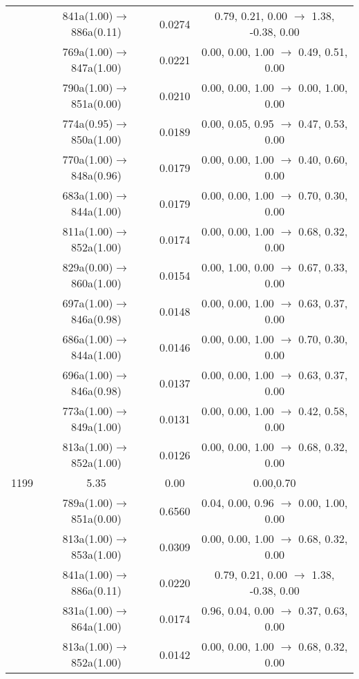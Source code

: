 \documentclass[10pt,a4paper]{article}
\begin{document}
\begin{longtable}{c|c|c|c}
 	& 841a(1.00)$\rightarrow$886a(0.11) &	 0.0274 &	 0.79, 0.21, 0.00 $\rightarrow$ 1.38, -0.38, 0.00 \\ 
 	& 769a(1.00)$\rightarrow$847a(1.00) &	 0.0221 &	 0.00, 0.00, 1.00 $\rightarrow$ 0.49, 0.51, 0.00 \\ 
 	& 790a(1.00)$\rightarrow$851a(0.00) &	 0.0210 &	 0.00, 0.00, 1.00 $\rightarrow$ 0.00, 1.00, 0.00 \\ 
 	& 774a(0.95)$\rightarrow$850a(1.00) &	 0.0189 &	 0.00, 0.05, 0.95 $\rightarrow$ 0.47, 0.53, 0.00 \\ 
 	& 770a(1.00)$\rightarrow$848a(0.96) &	 0.0179 &	 0.00, 0.00, 1.00 $\rightarrow$ 0.40, 0.60, 0.00 \\ 
 	& 683a(1.00)$\rightarrow$844a(1.00) &	 0.0179 &	 0.00, 0.00, 1.00 $\rightarrow$ 0.70, 0.30, 0.00 \\ 
 	& 811a(1.00)$\rightarrow$852a(1.00) &	 0.0174 &	 0.00, 0.00, 1.00 $\rightarrow$ 0.68, 0.32, 0.00 \\ 
 	& 829a(0.00)$\rightarrow$860a(1.00) &	 0.0154 &	 0.00, 1.00, 0.00 $\rightarrow$ 0.67, 0.33, 0.00 \\ 
 	& 697a(1.00)$\rightarrow$846a(0.98) &	 0.0148 &	 0.00, 0.00, 1.00 $\rightarrow$ 0.63, 0.37, 0.00 \\ 
 	& 686a(1.00)$\rightarrow$844a(1.00) &	 0.0146 &	 0.00, 0.00, 1.00 $\rightarrow$ 0.70, 0.30, 0.00 \\ 
 	& 696a(1.00)$\rightarrow$846a(0.98) &	 0.0137 &	 0.00, 0.00, 1.00 $\rightarrow$ 0.63, 0.37, 0.00 \\ 
 	& 773a(1.00)$\rightarrow$849a(1.00) &	 0.0131 &	 0.00, 0.00, 1.00 $\rightarrow$ 0.42, 0.58, 0.00 \\ 
 	& 813a(1.00)$\rightarrow$852a(1.00) &	 0.0126 &	 0.00, 0.00, 1.00 $\rightarrow$ 0.68, 0.32, 0.00 \\ 
 \hline1199 &	 5.35 &	 0.00 &	 0.00,0.70 \\ 
  	& 789a(1.00)$\rightarrow$851a(0.00) &	 0.6560 &	 0.04, 0.00, 0.96 $\rightarrow$ 0.00, 1.00, 0.00 \\ 
 	& 813a(1.00)$\rightarrow$853a(1.00) &	 0.0309 &	 0.00, 0.00, 1.00 $\rightarrow$ 0.68, 0.32, 0.00 \\ 
 	& 841a(1.00)$\rightarrow$886a(0.11) &	 0.0220 &	 0.79, 0.21, 0.00 $\rightarrow$ 1.38, -0.38, 0.00 \\ 
 	& 831a(1.00)$\rightarrow$864a(1.00) &	 0.0174 &	 0.96, 0.04, 0.00 $\rightarrow$ 0.37, 0.63, 0.00 \\ 
 	& 813a(1.00)$\rightarrow$852a(1.00) &	 0.0142 &	 0.00, 0.00, 1.00 $\rightarrow$ 0.68, 0.32, 0.00 \\ 

\end{longtable}
\end{document}

